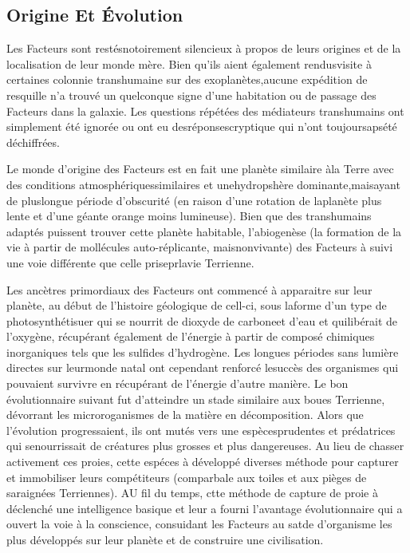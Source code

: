 \subsection{Origine Et Évolution} 

Les Facteurs sont restésnotoirement silencieux à propos de leurs origines et de la localisation de leur monde mère. Bien qu'ils aient également rendusvisite à certaines colonnie transhumaine sur des exoplanètes,aucune expédition de resquille n'a trouvé un quelconque signe d'une habitation ou de passage des Facteurs dans la galaxie. Les questions répétées des médiateurs transhumains ont simplement été ignorée ou ont eu desréponsescryptique qui n'ont toujoursapsété déchiffrées. 

Le monde d'origine des Facteurs est en fait une planète similaire àla Terre avec des conditions atmosphériquessimilaires et unehydropshère dominante,maisayant de pluslongue période d'obscurité (en raison d'une rotation de laplanète plus lente et d'une géante orange moins lumineuse). Bien que des transhumains adaptés puissent trouver cette planète habitable, l'abiogenèse (la formation de la vie à partir de mollécules auto-réplicante, maisnonvivante) des Facteurs à suivi une voie différente que celle priseprlavie Terrienne. 

Les ancètres primordiaux des Facteurs ont commencé à apparaitre sur leur planète, au début de l'histoire géologique de cell-ci, sous laforme d'un type de photosynthétisuer qui se nourrit de dioxyde de carboneet d'eau et quilibérait de l'oxygène, récupérant également de l'énergie à partir de composé chimiques inorganiques tels que les sulfides d'hydrogène. Les longues périodes sans lumière directes sur leurmonde natal ont cependant renforcé lesuccès des organismes qui pouvaient survivre en récupérant de l'énergie d'autre manière. Le bon évolutionnaire suivant fut d'atteindre un stade similaire aux boues Terrienne, dévorrant les microroganismes de la matière en décomposition. Alors que l'évolution progressaient, ils ont mutés vers une espècesprudentes et prédatrices qui senourrissait de créatures plus grosses et plus dangereuses. Au lieu de chasser activement ces proies, cette espéces à développé diverses méthode pour capturer et immobiliser leurs compétiteurs (comparbale aux toiles et aux pièges de saraignées Terriennes). AU fil du temps, ctte méthode de capture de proie à déclenché une intelligence basique et leur a fourni l'avantage évolutionnaire qui a ouvert la voie à la conscience, consuidant les Facteurs au satde d'organisme les plus développés sur leur planète et de construire une civilisation. 

